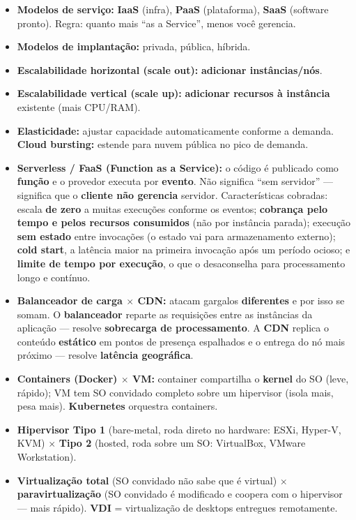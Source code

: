 \begin{itemize}
\item \textbf{Modelos de serviço:} \textbf{IaaS} (infra), \textbf{PaaS}
(plataforma), \textbf{SaaS} (software pronto). Regra: quanto mais ``as a
Service'', menos você gerencia.
\item \textbf{Modelos de implantação:} privada, pública, híbrida.
\item \textbf{Escalabilidade horizontal (scale out):} \textbf{adicionar
instâncias/nós}.
\item \textbf{Escalabilidade vertical (scale up):} \textbf{adicionar
recursos à instância} existente (mais CPU/RAM).
\item \textbf{Elasticidade:} ajustar capacidade automaticamente conforme a
demanda. \textbf{Cloud bursting:} estende para nuvem pública no pico de
demanda.
\item \textbf{Serverless / FaaS (Function as a Service):} o código é
publicado como \textbf{função} e o provedor executa por \textbf{evento}. Não
significa ``sem servidor'' --- significa que o \textbf{cliente não gerencia}
servidor. Características cobradas: escala \textbf{de zero} a muitas execuções
conforme os eventos; \textbf{cobrança pelo tempo e pelos recursos consumidos}
(não por instância parada); execução \textbf{sem estado} entre invocações (o
estado vai para armazenamento externo); \textbf{cold start}, a latência maior
na primeira invocação após um período ocioso; e \textbf{limite de tempo por
execução}, o que o desaconselha para processamento longo e contínuo.
\item \textbf{Balanceador de carga $\times$ CDN:} atacam gargalos
\textbf{diferentes} e por isso se somam. O \textbf{balanceador} reparte as
requisições entre as instâncias da aplicação --- resolve \textbf{sobrecarga de
processamento}. A \textbf{CDN} replica o conteúdo \textbf{estático} em pontos
de presença espalhados e o entrega do nó mais próximo --- resolve
\textbf{latência geográfica}.
\item \textbf{Containers (Docker) $\times$ VM:} container compartilha o
\textbf{kernel} do SO (leve, rápido); VM tem SO convidado completo sobre um
hipervisor (isola mais, pesa mais). \textbf{Kubernetes} orquestra containers.
\item \textbf{Hipervisor Tipo 1} (bare-metal, roda direto no hardware: ESXi,
Hyper-V, KVM) $\times$ \textbf{Tipo 2} (hosted, roda sobre um SO: VirtualBox,
VMware Workstation).
\item \textbf{Virtualização total} (SO convidado não sabe que é virtual)
$\times$ \textbf{paravirtualização} (SO convidado é modificado e coopera com
o hipervisor --- mais rápido). \textbf{VDI} = virtualização de desktops
entregues remotamente.
\end{itemize}

